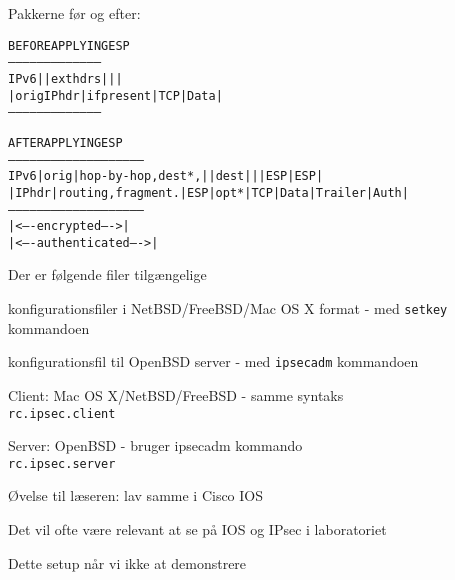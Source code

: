 \documentclass[Screen16to9,17pt]{foils}
\begin{document}

Pakkerne før og efter:
\begin{alltt}
\small
               BEFORE APPLYING ESP
         ---------------------------------------
   IPv6  |             | ext hdrs |     |      |
         | orig IP hdr |if present| TCP | Data |
         ---------------------------------------



               AFTER APPLYING ESP
         ---------------------------------------------------------
   IPv6  | orig |hop-by-hop,dest*,|   |dest|   |    | ESP   | ESP|
         |IP hdr|routing,fragment.|ESP|opt*|TCP|Data|Trailer|Auth|
         ---------------------------------------------------------
                                   |<---- encrypted ---->|
                               |<---- authenticated ---->|
\end{alltt}


\begin{list1}
\item Der er følgende filer tilgængelige\\
  \begin{list2}
  \item konfigurationsfiler i NetBSD/FreeBSD/Mac OS X format - med
    \verb+setkey+ kommandoen
  \item konfigurationsfil til OpenBSD server - med \verb+ipsecadm+
    kommandoen
  \end{list2}
\end{list1}




\begin{list1}
  \item Client: Mac OS X/NetBSD/FreeBSD - samme syntaks\\
\verb+rc.ipsec.client+

\item Server: OpenBSD - bruger ipsecadm kommando\\
\verb+rc.ipsec.server+

\item Øvelse til læseren: lav samme i Cisco IOS
\item Det vil ofte være relevant at se på IOS og IPsec i laboratoriet
\item Dette setup når vi ikke at demonstrere
\end{list1}
\end{document}
